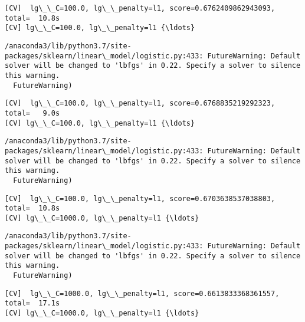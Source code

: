 \documentclass[11pt]{article}
\begin{document}
    \begin{Verbatim}[commandchars=\\\{\}]
[CV]  lg\_\_C=100.0, lg\_\_penalty=l1, score=0.6762409862943093, total=  10.8s
[CV] lg\_\_C=100.0, lg\_\_penalty=l1 {\ldots}

    \end{Verbatim}

    \begin{Verbatim}[commandchars=\\\{\}]
/anaconda3/lib/python3.7/site-packages/sklearn/linear\_model/logistic.py:433: FutureWarning: Default solver will be changed to 'lbfgs' in 0.22. Specify a solver to silence this warning.
  FutureWarning)

    \end{Verbatim}

    \begin{Verbatim}[commandchars=\\\{\}]
[CV]  lg\_\_C=100.0, lg\_\_penalty=l1, score=0.6768835219292323, total=   9.0s
[CV] lg\_\_C=100.0, lg\_\_penalty=l1 {\ldots}

    \end{Verbatim}

    \begin{Verbatim}[commandchars=\\\{\}]
/anaconda3/lib/python3.7/site-packages/sklearn/linear\_model/logistic.py:433: FutureWarning: Default solver will be changed to 'lbfgs' in 0.22. Specify a solver to silence this warning.
  FutureWarning)

    \end{Verbatim}

    \begin{Verbatim}[commandchars=\\\{\}]
[CV]  lg\_\_C=100.0, lg\_\_penalty=l1, score=0.6703638537038803, total=  10.8s
[CV] lg\_\_C=1000.0, lg\_\_penalty=l1 {\ldots}

    \end{Verbatim}

    \begin{Verbatim}[commandchars=\\\{\}]
/anaconda3/lib/python3.7/site-packages/sklearn/linear\_model/logistic.py:433: FutureWarning: Default solver will be changed to 'lbfgs' in 0.22. Specify a solver to silence this warning.
  FutureWarning)

    \end{Verbatim}

    \begin{Verbatim}[commandchars=\\\{\}]
[CV]  lg\_\_C=1000.0, lg\_\_penalty=l1, score=0.6613833368361557, total=  17.1s
[CV] lg\_\_C=1000.0, lg\_\_penalty=l1 {\ldots}

    \end{Verbatim}
\end{document}
